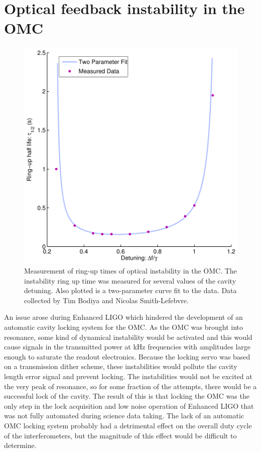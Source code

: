 \section{Optical feedback instability in the OMC}
\begin{figure}
  \begin{center}
  \leavevmode
  \includegraphics{figs-omc/raddamping.pdf}
  \end{center}
  \caption[Measurement of ring-up times of optical instability in the OMC.]{Measurement of ring-up times of optical instability in the OMC. The instability ring up time was measured for several values of the cavity detuning. Also plotted is a two-parameter curve fit to the data. Data collected by Tim Bodiya and Nicolas Smith-Lefebvre.}
  \label{fig:raddamping}
\end{figure}
An issue arose during Enhanced LIGO which hindered the development of an automatic cavity locking system for the OMC. %
As the OMC was brought into resonance, some kind of dynamical instability would be activated and this would cause signals in the transmitted power at kHz frequencies with amplitudes large enough to saturate the readout electronics. %
Because the locking servo was based on a transmission dither scheme, these instabilities would pollute the cavity length error signal and prevent locking. %
The instabilities would not be excited at the very peak of resonance, so for some fraction of the attempts, there would be a successful lock of the cavity. %
The result of this is that locking the OMC was the only step in the lock acquisition and low noise operation of Enhanced LIGO that was not fully automated during science data taking. %
The lack of an automatic OMC locking system probably had a detrimental effect on the overall duty cycle of the interferometers, but the magnitude of this effect would be difficult to determine.

